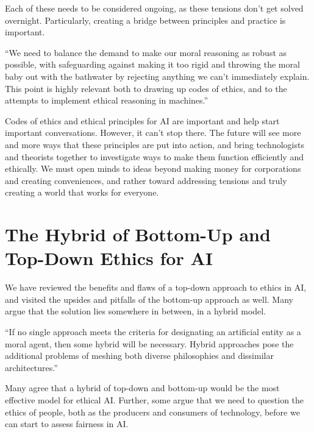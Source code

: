 \documentclass{svproc}
\begin{document}
Each of these needs to be considered ongoing, as these tensions don’t get solved overnight. Particularly, creating a bridge between principles and practice is important. 
\begin{displayquote}
“We need to balance the demand to make our moral reasoning as robust as possible, with safeguarding against making it too rigid and throwing the moral baby out with the bathwater by rejecting anything we can’t immediately explain. This point is highly relevant both to drawing up codes of ethics, and to the attempts to implement ethical reasoning in machines.” \cite{Boddington2017TowardsIntelligence}
\end{displayquote}

Codes of ethics and ethical principles for AI are important and help start important conversations. However, it can’t stop there. The future will see more and more ways that these principles are put into action, and bring technologists and theorists together to investigate ways to make them function efficiently and ethically. We must open minds to ideas beyond making money for corporations and creating conveniences, and rather toward addressing tensions and truly creating a world that works for everyone. 

\section{The Hybrid of Bottom-Up and Top-Down Ethics for AI}

We have reviewed the benefits and flaws of a top-down approach to ethics in AI, and visited the upsides and pitfalls of the bottom-up approach as well. Many argue that the solution lies somewhere in between, in a hybrid model. 

\begin{displayquote}
“If no single approach meets the criteria for designating an artiﬁcial entity as a moral agent, then some hybrid will be necessary. Hybrid approaches pose the additional problems of meshing both diverse philosophies and dissimilar architectures.” \cite{Allen2005ArtificialApproaches}
\end{displayquote}

Many agree that a hybrid of top-down and bottom-up would be the most effective model for ethical AI. Further, some argue that we need to question the ethics of people, both as the producers and consumers of technology, before we can start to assess fairness in AI.
\end{document}
